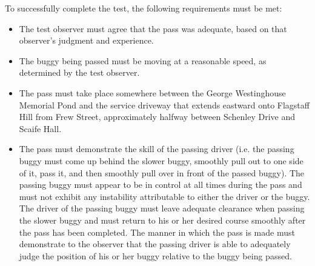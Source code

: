 	To successfully complete the test, the following requirements must be met:

	\begin{itemize}

		\item The test observer must agree that the pass was adequate, based on
		that observer's judgment and experience.

		\item The buggy being passed must be moving at a reasonable speed, as
		determined by the test observer.

		\item The pass must take place somewhere between the George Westinghouse
		Memorial Pond and the service driveway that extends eastward onto Flagstaff
		Hill from Frew Street, approximately halfway between Schenley Drive and Scaife
		Hall.

		\item The pass must demonstrate the skill of the passing driver (i.e. the
		passing buggy must come up behind the slower buggy, smoothly pull out to one
		side of it, pass it, and then smoothly pull over in front of the passed buggy).
		The passing buggy must appear to be in control at all times during the pass and
		must not exhibit any instability attributable to either the driver or the
		buggy. The driver of the passing buggy must leave adequate clearance when
		passing the slower buggy and must return to his or her desired course smoothly
		after the pass has been completed. The manner in which the pass is made must
		demonstrate to the observer that the passing driver is able to adequately judge
		the position of his or her buggy relative to the buggy being passed.

	\end{itemize}


